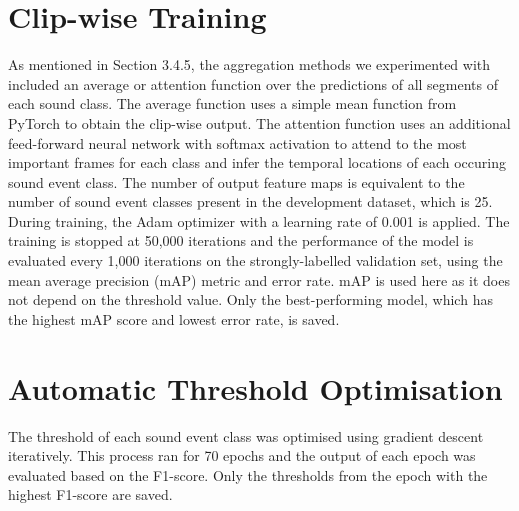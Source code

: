 \section{Clip-wise Training}
As mentioned in Section 3.4.5, the aggregation methods we experimented with included an average or attention function over the predictions of all segments of each sound class. The average function uses a simple mean function from PyTorch to obtain the clip-wise output. The attention function uses an additional feed-forward neural network with softmax activation to attend to the most important frames for each class and infer the temporal locations of each occuring sound event class. The number of output feature maps is equivalent to the number of sound event classes present in the development dataset, which is 25.\\


During training, the Adam optimizer \cite{kingma2017adam} with a learning rate of 0.001 is applied. The training is stopped at 50,000 iterations and the performance of the model is evaluated every 1,000 iterations on the strongly-labelled validation set, using the mean average precision (mAP) metric and error rate. mAP is used here as it does not depend on the threshold value. Only the best-performing model, which has the highest mAP score and lowest error rate, is saved. 

\section{Automatic Threshold Optimisation}
The threshold of each sound event class was optimised using gradient descent iteratively. This process ran for 70 epochs and the output of each epoch was evaluated based on the F1-score. Only the thresholds from the epoch with the highest F1-score are saved. 

\newpage